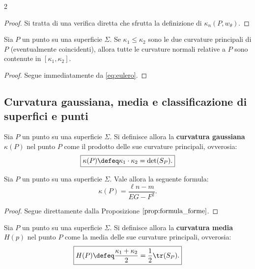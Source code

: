 \begin{multicols*}{2}
    \begin{proof}
        Si tratta di una verifica diretta che sfrutta la definizione di
        $\kappa_n(P, w_\theta)$.
    \end{proof}

    \begin{proposition}
        Sia $P$ un punto su una superficie $\Sigma$. Se $\kappa_1 \leq \kappa_2$ sono
        le due curvature principali di $P$ (eventualmente coincidenti), allora
        tutte le curvature normali relative a $P$ sono contenute in $[\kappa_1, \kappa_2]$.
    \end{proposition}

    \begin{proof}
        Segue immediatamente da \eqref{eq:eulero}.
    \end{proof}

    \subsection{Curvatura gaussiana, media e classificazione di superfici e punti}

    \begin{definition}
        Sia $P$ un punto su una superficie $\Sigma$. Si definisce allora
        la \textbf{curvatura gaussiana} $\kappa(P)$ nel punto $P$ come il prodotto delle
        sue curvature principali, ovverosia:
        \[
            \boxed{\kappa(P) \defeq \kappa_1 \cdot \kappa_2 = \det(S_P).}
        \]
    \end{definition}

    \begin{proposition}
        Sia $P$ un punto su una superficie $\Sigma$. Vale allora la seguente formula:
        \[
            \boxed{\kappa(P) = \frac{\ell n - m}{EG - F^2}.}
        \]
    \end{proposition}

    \begin{proof}
        Segue direttamente dalla Proposizione $\ref{prop:formula_forme}$.
    \end{proof}

    \begin{proposition}
        Sia $P$ un punto su una superficie $\Sigma$. Si definisce allora
        la \textbf{curvatura media} $H(p)$ nel punto $P$ come la media delle sue
        curvature principali, ovverosia:
        \[
            \boxed{H(P) \defeq \frac{\kappa_1 + \kappa_2}{2} = \frac{1}{2} \tr(S_P).}
        \]
    \end{proposition}


\end{multicols*}
